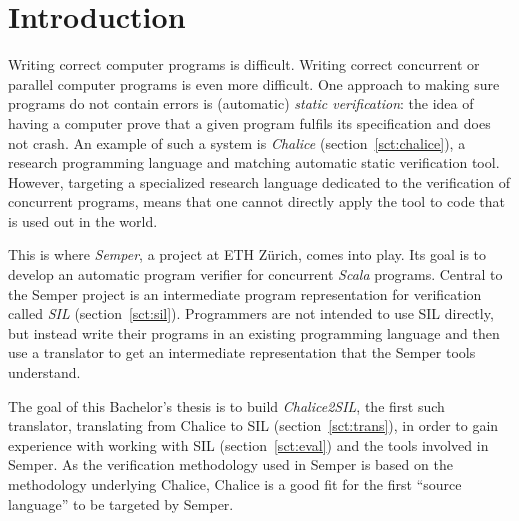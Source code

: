 
\section{Introduction}
Writing correct computer programs is difficult. 
Writing correct concurrent or parallel computer programs is even more difficult. 
One approach to making sure programs do not contain errors is (automatic) \emph{static verification}: the idea of having a computer prove that a given program fulfils its specification and does not crash.
An example of such a system is \emph{Chalice} \cite{LMS09} (section~\ref{sct:chalice}), a research programming language and matching automatic static verification tool.
However, targeting a specialized research language dedicated to the verification of concurrent programs, means that one cannot directly apply the tool to code that is used out in the world.

This is where \emph{Semper}, a project at ETH Zürich, comes into play. 
Its goal is to develop an automatic program verifier for concurrent \emph{Scala} \cite{Scala} programs.
Central to the Semper project is an intermediate program representation for verification called \emph{SIL} (section~\ref{sct:sil}).
Programmers are not intended to use SIL directly, but instead write their programs in an existing programming  language and then use a translator to get an intermediate representation that the Semper tools understand.

The goal of this Bachelor's thesis is to build \emph{Chalice2SIL}, the first such translator, translating from Chalice to SIL (section~\ref{sct:trans}), in order to gain experience with working with SIL (section~\ref{sct:eval}) and the tools involved in Semper.
As the verification methodology used in Semper is based on the methodology underlying Chalice, Chalice is a good fit for the first ``source language'' to be targeted by Semper.